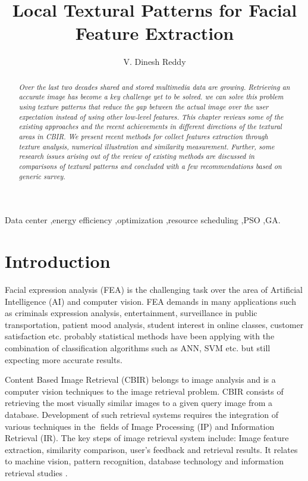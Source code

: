 \documentclass[review]{elsarticle}
\begin{document}
	\begin{frontmatter}
			\title{Local Textural Patterns for Facial Feature Extraction}
		\author[mysecondaryaddress]{V. Dinesh Reddy}
		\address[mysecondaryaddress]{Global Technology Office- Foundational Research,Cognizant Technology Solutions}
	
		
		\begin{abstract}
		\textit{ Over the last two decades shared and stored multimedia data are growing. Retrieving an accurate image has become a key challenge yet to be solved. we can solve this problem using texture patterns that reduce the gap between the actual image over the user expectation instead of using other low-level features. This chapter 
			reviews some of the existing approaches and the recent achievements in different directions  of the textural areas in CBIR. We present recent methods for   collect  features extraction through texture analysis, numerical illustration and similarity measurement. Further, some research issues arising out of the review of existing methods are discussed in comparisons of textural patterns and concluded with a few recommendations based on generic survey. }
	\end{abstract}
	\begin{keyword}
		Data center \sep  energy efficiency \sep optimization \sep  resource  scheduling \sep PSO \sep GA.
	\end{keyword}
\end{frontmatter}


\section{Introduction}
\label{intro-chapter}
Facial expression analysis (FEA) is the challenging task over the area of Artificial Intelligence (AI) and computer vision. FEA demands in many applications such as criminals expression analysis, entertainment, surveillance in public transportation, patient mood analysis, student interest in online classes, customer satisfaction etc. probably statistical methods have been applying with the combination of classification algorithms such as ANN, SVM etc. but still expecting more accurate results.

Content Based Image Retrieval (CBIR) belongs to image analysis and is a  computer vision techniques to the image retrieval problem. CBIR consists of retrieving the most visually similar images to a given query image from a database. Development of such retrieval systems requires the integration of various techniques in the fields of Image Processing (IP) and Information Retrieval (IR).  The key steps of image retrieval system include:  Image feature extraction, similarity comparison, user's feedback and retrieval results. It relates to machine vision, pattern recognition, database technology and information retrieval studies \cite{18zen2016learning}. 
\end{document}
